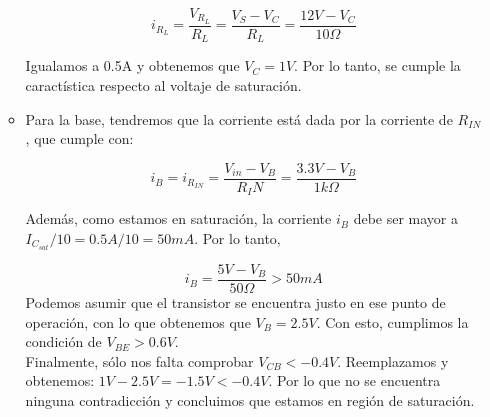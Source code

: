 \documentclass[11pt,fancy,lang=es]{elegantbook}
\begin{document}
\begin{example}
\begin{enumerate}
\begin{itemize}
                        \begin{equation}
                            i_{R_L}=\frac{V_{R_L}}{R_L}=\frac{V_S-V_C}{R_L}=\frac{12V-V_C}{10\Omega}
                        \end{equation}

                        Igualamos a 0.5A y obtenemos que $V_C=1V$. Por lo tanto, se cumple la caractística respecto al voltaje de saturación.

                  \item Para la base, tendremos que la corriente está dada por la corriente de $R_{IN}$, que cumple con:

                        \begin{equation*}
                            i_B=i_{R_{IN}}=\frac{V_{in}-V_B}{R_IN}=\frac{3.3V-V_B}{1k\Omega}
                        \end{equation*}

                        Además, como estamos en saturación, la corriente $i_B$ debe ser mayor a $I_{C_{sat}}/10=0.5A/10=50mA$. Por lo tanto,

                        \begin{equation*}
                            i_B=\frac{5V-V_B}{50\Omega}>50mA
                        \end{equation*}
                        Podemos asumir que el transistor se encuentra justo en ese punto de operación, con lo que obtenemos que $V_B=2.5V$. Con esto, cumplimos la condición de $V_{BE}>0.6V$.\\
                        Finalmente, sólo nos falta comprobar $V_{CB}<-0.4V$. Reemplazamos y obtenemos: $1V-2.5V=-1.5V<-0.4V$. Por lo que no se encuentra ninguna contradicción y concluimos que estamos en región de saturación.


              \end{itemize}
    \end{enumerate}


\end{example}
\end{document}
